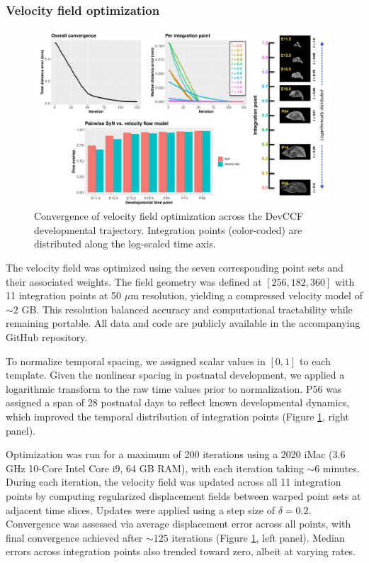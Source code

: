 \documentclass[
  12pt,
]{article}
\begin{document}
\subsubsection{Velocity field
optimization}\label{velocity-field-optimization}

\begin{figure}[!htb]
\centering
\includegraphics[width=0.99\textwidth]{Figures/convergence.pdf}
\caption{Convergence of velocity field optimization across the DevCCF
developmental trajectory. Integration points (color-coded) are distributed along
the log-scaled time axis.}
\label{fig:convergence}
\end{figure}

The velocity field was optimized using the seven corresponding point
sets and their associated weights. The field geometry was defined at
\([256, 182, 360]\) with 11 integration points at 50 \(\mu\)m
resolution, yielding a compressed velocity model of \(\sim 2\) GB. This
resolution balanced accuracy and computational tractability while
remaining portable. All data and code are publicly available in the
accompanying GitHub repository.

To normalize temporal spacing, we assigned scalar values in \([0, 1]\)
to each template. Given the nonlinear spacing in postnatal development,
we applied a logarithmic transform to the raw time values prior to
normalization. P56 was assigned a span of 28 postnatal days to reflect
known developmental dynamics, which improved the temporal distribution
of integration points (Figure \ref{fig:convergence}, right panel).

Optimization was run for a maximum of 200 iterations using a 2020 iMac
(3.6 GHz 10-Core Intel Core i9, 64 GB RAM), with each iteration taking
\(\sim 6\) minutes. During each iteration, the velocity field was
updated across all 11 integration points by computing regularized
displacement fields between warped point sets at adjacent time slices.
Updates were applied using a step size of \(\delta = 0.2\). Convergence
was assessed via average displacement error across all points, with
final convergence achieved after \(\sim 125\) iterations (Figure
\ref{fig:convergence}, left panel). Median errors across integration
points also trended toward zero, albeit at varying rates.
\end{document}
